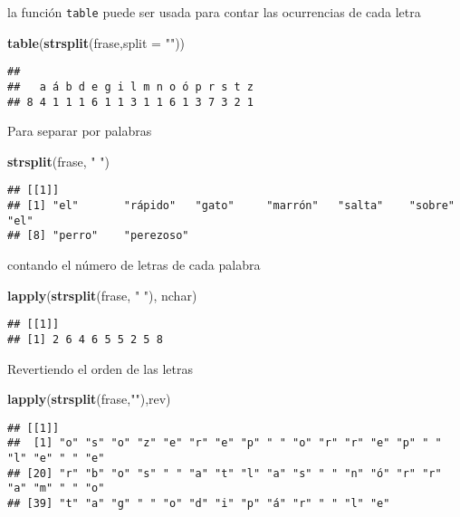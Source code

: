 \documentclass[]{article}
\newenvironment{Shaded}{\begin{snugshade}}{\end{snugshade}}
\newcommand{\KeywordTok}[1]{\textcolor[rgb]{0.13,0.29,0.53}{\textbf{#1}}}
\newcommand{\DataTypeTok}[1]{\textcolor[rgb]{0.13,0.29,0.53}{#1}}
\newcommand{\StringTok}[1]{\textcolor[rgb]{0.31,0.60,0.02}{#1}}
\newcommand{\NormalTok}[1]{#1}
\begin{document}
la función \texttt{table} puede ser usada para contar las ocurrencias de
cada letra

\begin{Shaded}
\begin{Highlighting}[]
\KeywordTok{table}\NormalTok{(}\KeywordTok{strsplit}\NormalTok{(frase,}\DataTypeTok{split =} \StringTok{""}\NormalTok{))}
\end{Highlighting}
\end{Shaded}

\begin{verbatim}
## 
##   a á b d e g i l m n o ó p r s t z 
## 8 4 1 1 1 6 1 1 3 1 1 6 1 3 7 3 2 1
\end{verbatim}

Para separar por palabras

\begin{Shaded}
\begin{Highlighting}[]
\KeywordTok{strsplit}\NormalTok{(frase, }\StringTok{" "}\NormalTok{)}
\end{Highlighting}
\end{Shaded}

\begin{verbatim}
## [[1]]
## [1] "el"       "rápido"   "gato"     "marrón"   "salta"    "sobre"    "el"      
## [8] "perro"    "perezoso"
\end{verbatim}

contando el número de letras de cada palabra

\begin{Shaded}
\begin{Highlighting}[]
\KeywordTok{lapply}\NormalTok{(}\KeywordTok{strsplit}\NormalTok{(frase, }\StringTok{" "}\NormalTok{), nchar)}
\end{Highlighting}
\end{Shaded}

\begin{verbatim}
## [[1]]
## [1] 2 6 4 6 5 5 2 5 8
\end{verbatim}

Revertiendo el orden de las letras

\begin{Shaded}
\begin{Highlighting}[]
\KeywordTok{lapply}\NormalTok{(}\KeywordTok{strsplit}\NormalTok{(frase,}\StringTok{""}\NormalTok{),rev)}
\end{Highlighting}
\end{Shaded}

\begin{verbatim}
## [[1]]
##  [1] "o" "s" "o" "z" "e" "r" "e" "p" " " "o" "r" "r" "e" "p" " " "l" "e" " " "e"
## [20] "r" "b" "o" "s" " " "a" "t" "l" "a" "s" " " "n" "ó" "r" "r" "a" "m" " " "o"
## [39] "t" "a" "g" " " "o" "d" "i" "p" "á" "r" " " "l" "e"
\end{verbatim}
\end{document}
